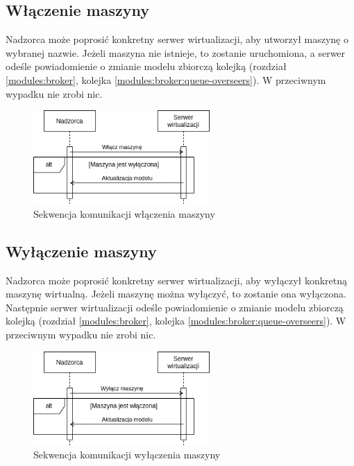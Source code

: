 \documentclass[../opis-rozwiazania.tex]{subfiles}
\begin{document}
\subsection{Włączenie maszyny}

Nadzorca może poprosić konkretny serwer wirtualizacji, aby utworzył maszynę o wybranej nazwie.
Jeżeli maszyna nie istnieje, to zostanie uruchomiona, a serwer odeśle powiadomienie o zmianie modelu zbiorczą kolejką (rozdział \ref{modules:broker}, kolejka \ref{modules:broker:queue-overseers}).
W przeciwnym wypadku nie zrobi nic.

\begin{figure}[ht!]
  \centering
  \includegraphics[width=0.6\textwidth]{../diagrams/sequence_diagrams/wlaczenie_maszyny.png}
  \caption{Sekwencja komunikacji włączenia maszyny}
  \label{figure:diagrams:sequence_diagrams:wlaczenie_maszyny}
\end{figure}

\subsection{Wyłączenie maszyny}

Nadzorca może poprosić konkretny serwer wirtualizacji, aby wyłączył konkretną maszynę wirtualną.
Jeżeli maszynę można wyłączyć, to zostanie ona wyłączona.
Następnie serwer wirtualizacji odeśle powiadomienie o zmianie modelu zbiorczą kolejką (rozdział \ref{modules:broker}, kolejka \ref{modules:broker:queue-overseers}).
W przeciwnym wypadku nie zrobi nic.

\begin{figure}[ht!]
  \centering
  \includegraphics[width=0.6\textwidth]{../diagrams/sequence_diagrams/wylaczenie_maszyny.png}
  \caption{Sekwencja komunikacji wyłączenia maszyny}
  \label{figure:diagrams:sequence_diagrams:wylaczenie_maszyny}
\end{figure}
\end{document}

